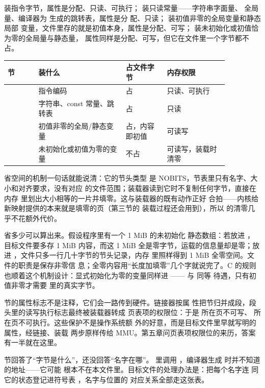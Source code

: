  装指令字节，属性是分配、只读、可执行；
 装只读常量——字符串字面量、
全局量、编译器为  生成的跳转表，属性是分
配、只读； 装初值非零的全局变量和静态局部
变量，文件里存的就是初值本身，属性是分配、可写；
 装未初始化或初值恰为零的全局量与静态量，
属性同样是分配、可写，但它在文件里一个字节都不占。

\begin{longtable}{L{0.12\linewidth}L{0.34\linewidth}L{0.16\linewidth}L{0.24\linewidth}}
\toprule
节 & 装什么 & 占文件字节 & 内存权限 \\
\midrule
{} & 指令编码 & 占 & 只读、可执行 \\
 & 字符串、const 常量、跳转表 & 占 & 只读 \\
 & 初值非零的全局/静态变量 & 占，内容即初值 & 可读写 \\
 & 未初始化或初值为零的变量 & 不占 & 可读写，装载时清零 \\
\bottomrule
\end{longtable}

 省空间的机制一句话就能说清：它的节头类型
是 NOBITS，节表里只有名字、大小和对齐要求，没有对应
的文件范围；装载器读到它时不复制任何字节，直接在内存
里划出大小相等的一片并填零。这与装载器的既有动作正好
合拍——内核给新映射提供的本来就是填零的页（第三节的
装载过程还会用到），所以
 的清零几乎不花额外代价。

省多少可以算出来。假设程序里有一个 1 MiB 的未初始化
静态数组：若放进 ，目标文件要多存 1 MiB
内容，而这 1 MiB 全是零字节，运载的信息量却是零；放
进 ，文件只多一行几十字节的节头记录，内存
里照样得到 1 MiB 全零空间。文件的职责是保存非零信
息；全零内容用“长度加填零”几个字就说完了。C 的规则
也顺着这个机制设计：显式初始化为零的变量同样进
—— 与  同等
待遇，只有初值非零才需要  里的真实字节。

节的属性标志不是注释，它们会一路传到硬件。链接器按属
性把节归并成段，段头里的读写执行标志最终被装载器转成
页表项的权限位：于是  所在页不可写、
 所在页不可执行。这些保护不是操作系统额
外的好意，而是目标文件里早就写明的属性，经链接、装载
两步原样传给 MMU。第五章问页表项权限位的来历，答案
有一半就在这里。

节回答了“字节是什么”，还没回答“名字在哪”。
 里调用 ，编译器生成
 时并不知道  的地址——它可能
根本不在本文件里。目标文件的处理办法是：把每个名字连
同它的状态登记进符号表 ，名字与位置的
对应关系全部走这张表。

